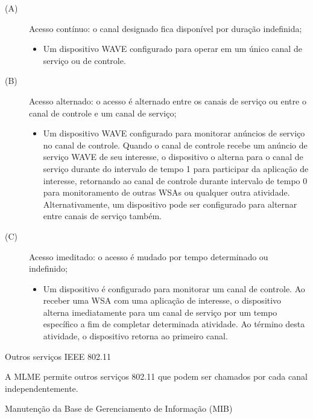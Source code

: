 \documentclass[
12pt,				%
openright,			%
oneside,			%
a4paper,			%
brazil,				%
]{abntex2}
\begin{document}
	\begin{description}
		
		\item[(A)] Acesso contínuo: o canal designado fica disponível por duração indefinida;
		\begin{itemize}
			\item Um dispositivo WAVE configurado para operar em um único canal de serviço ou de controle.
		\end{itemize}
		
		\item[(B)] Acesso alternado: o acesso é alternado entre os canais de serviço ou entre o canal de controle e um canal de serviço;
		\begin{itemize}
			\item Um dispositivo WAVE configurado para monitorar anúncios de serviço no canal de controle. Quando o canal de controle recebe um anúncio de serviço WAVE de seu interesse, o dispositivo o alterna para o canal de serviço durante do intervalo de tempo 1 para participar da aplicação de interesse, retornando ao canal de controle durante intervalo de tempo 0 para monitoramento de outras WSAs ou qualquer outra atividade. Alternativamente, um dispositivo pode ser configurado para alternar entre canais de serviço também.
		\end{itemize}
		
		\item[(C)] Acesso imeditado: o acesso é mudado por tempo determinado ou indefinido;
		\begin{itemize}
			\item Um dispositivo é configurado para monitorar um canal de controle. Ao receber uma WSA com uma aplicação de interesse, o dispositivo alterna imediatamente para um canal de serviço por um tempo específico a fim de completar determinada atividade. Ao término desta atividade, o dispositivo retorna ao primeiro canal.
		\end{itemize}		
	\end{description}
	
	\begin{description}
        \item[Outros serviços IEEE 802.11]
    \end{description}
	
	\par A MLME permite outros serviços 802.11 que podem ser chamados por cada canal independentemente.
	
	\begin{description}
        \item[Manutenção da Base de Gerenciamento de Informação (MIB)]
    \end{description}
	
\end{document}
